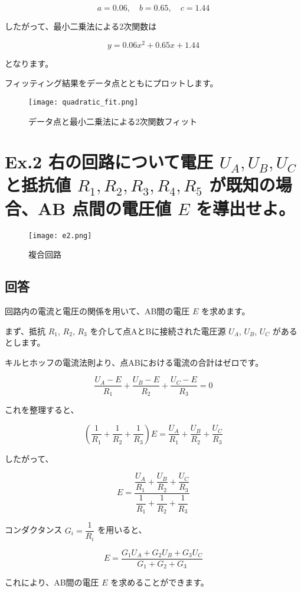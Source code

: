 \documentclass{article}
\begin{document}
\[
a = 0.06, \quad b = 0.65, \quad c = 1.44
\]

したがって、最小二乗法による2次関数は

\[
y = 0.06x^2 + 0.65x + 1.44
\]

となります。

フィッティング結果をデータ点とともにプロットします。

\begin{figure}[H]
    \centering
    \texttt{[image: quadratic\_fit.png]}
    \caption{データ点と最小二乗法による2次関数フィット}
\end{figure}

\newpage  %

\section*{Ex.2 右の回路について電圧 \(U_A, U_B, U_C\) と抵抗値 \(R_1, R_2, R_3, R_4, R_5\) が既知の場合、AB 点間の電圧値 \(E\) を導出せよ。}
\begin{figure}[H]
    \centering
    \texttt{[image: e2.png]}
    \caption{複合回路}
\end{figure}

\subsection*{回答}
回路内の電流と電圧の関係を用いて、AB間の電圧 \(E\) を求めます。

まず、抵抗 \(R_1\), \(R_2\), \(R_3\) を介して点AとBに接続された電圧源 \(U_A\), \(U_B\), \(U_C\) があるとします。

キルヒホッフの電流法則より、点ABにおける電流の合計はゼロです。

\[
\frac{U_A - E}{R_1} + \frac{U_B - E}{R_2} + \frac{U_C - E}{R_3} = 0
\]

これを整理すると、

\[
\left( \frac{1}{R_1} + \frac{1}{R_2} + \frac{1}{R_3} \right) E = \frac{U_A}{R_1} + \frac{U_B}{R_2} + \frac{U_C}{R_3}
\]

したがって、

\[
E = \frac{\dfrac{U_A}{R_1} + \dfrac{U_B}{R_2} + \dfrac{U_C}{R_3}}{\dfrac{1}{R_1} + \dfrac{1}{R_2} + \dfrac{1}{R_3}}
\]

コンダクタンス \(G_i = \dfrac{1}{R_i}\) を用いると、

\[
E = \frac{G_1 U_A + G_2 U_B + G_3 U_C}{G_1 + G_2 + G_3}
\]

これにより、AB間の電圧 \(E\) を求めることができます。
\end{document}
